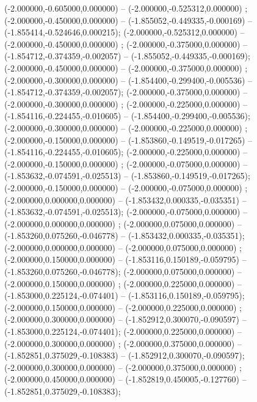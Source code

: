  (-2.000000,-0.605000,0.000000) -- (-2.000000,-0.525312,0.000000) ;
 (-2.000000,-0.450000,0.000000) -- (-1.855052,-0.449335,-0.000169) -- (-1.855414,-0.524646,0.000215);
 (-2.000000,-0.525312,0.000000) -- (-2.000000,-0.450000,0.000000) ;
 (-2.000000,-0.375000,0.000000) -- (-1.854712,-0.374359,-0.002057) -- (-1.855052,-0.449335,-0.000169);
 (-2.000000,-0.450000,0.000000) -- (-2.000000,-0.375000,0.000000) ;
 (-2.000000,-0.300000,0.000000) -- (-1.854400,-0.299400,-0.005536) -- (-1.854712,-0.374359,-0.002057);
 (-2.000000,-0.375000,0.000000) -- (-2.000000,-0.300000,0.000000) ;
 (-2.000000,-0.225000,0.000000) -- (-1.854116,-0.224455,-0.010605) -- (-1.854400,-0.299400,-0.005536);
 (-2.000000,-0.300000,0.000000) -- (-2.000000,-0.225000,0.000000) ;
 (-2.000000,-0.150000,0.000000) -- (-1.853860,-0.149519,-0.017265) -- (-1.854116,-0.224455,-0.010605);
 (-2.000000,-0.225000,0.000000) -- (-2.000000,-0.150000,0.000000) ;
 (-2.000000,-0.075000,0.000000) -- (-1.853632,-0.074591,-0.025513) -- (-1.853860,-0.149519,-0.017265);
 (-2.000000,-0.150000,0.000000) -- (-2.000000,-0.075000,0.000000) ;
 (-2.000000,0.000000,0.000000) -- (-1.853432,0.000335,-0.035351) -- (-1.853632,-0.074591,-0.025513);
 (-2.000000,-0.075000,0.000000) -- (-2.000000,0.000000,0.000000) ;
 (-2.000000,0.075000,0.000000) -- (-1.853260,0.075260,-0.046778) -- (-1.853432,0.000335,-0.035351);
 (-2.000000,0.000000,0.000000) -- (-2.000000,0.075000,0.000000) ;
 (-2.000000,0.150000,0.000000) -- (-1.853116,0.150189,-0.059795) -- (-1.853260,0.075260,-0.046778);
 (-2.000000,0.075000,0.000000) -- (-2.000000,0.150000,0.000000) ;
 (-2.000000,0.225000,0.000000) -- (-1.853000,0.225124,-0.074401) -- (-1.853116,0.150189,-0.059795);
 (-2.000000,0.150000,0.000000) -- (-2.000000,0.225000,0.000000) ;
 (-2.000000,0.300000,0.000000) -- (-1.852912,0.300070,-0.090597) -- (-1.853000,0.225124,-0.074401);
 (-2.000000,0.225000,0.000000) -- (-2.000000,0.300000,0.000000) ;
 (-2.000000,0.375000,0.000000) -- (-1.852851,0.375029,-0.108383) -- (-1.852912,0.300070,-0.090597);
 (-2.000000,0.300000,0.000000) -- (-2.000000,0.375000,0.000000) ;
 (-2.000000,0.450000,0.000000) -- (-1.852819,0.450005,-0.127760) -- (-1.852851,0.375029,-0.108383);
